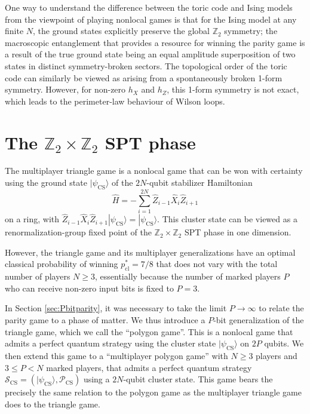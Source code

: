 \documentclass[prb,twocolumn,showpacs,amssymb,superscriptaddress]{revtex4-2}
\begin{document}
One way to understand the difference between the toric code and Ising models from the viewpoint of playing nonlocal games is that for the Ising model at any finite $N$, the ground states explicitly preserve the global $\mathbb{Z}_2$ symmetry; the macroscopic entanglement that provides a resource for winning the parity game is a result of the true ground state being an equal amplitude superposition of two states in distinct symmetry-broken sectors. The topological order of the toric code can similarly be viewed as arising from a spontaneously broken 1-form symmetry\cite{GKSW}.  However, for non-zero $h_X$ and $h_Z$, this 1-form symmetry is not exact, which leads to the perimeter-law behaviour of Wilson loops. 

\section{The $\mathbb{Z}_2 \times \mathbb{Z}_2$ SPT phase}
The multiplayer triangle game\cite{Cluster,Bravyi,DanielMiyake} is a nonlocal game that can be won with certainty using the ground state $|\psi_{\mathrm{CS}}\rangle$ of the $2N$-qubit stabilizer Hamiltonian
\begin{equation}
\hat{H} = -\sum_{i=1}^{2N} \hat{Z}_{i-1} \hat{X}_{i} \hat{Z}_{i+1}
\end{equation}
on a ring, with $\hat{Z}_{i-1}\hat{X}_{i}\hat{Z}_{i+1}|\psi_{\mathrm{CS}}\rangle = |\psi_{\mathrm{CS}}\rangle$. This cluster state can be viewed as a renormalization-group fixed point of the $\mathbb{Z}_2 \times \mathbb{Z}_2$ SPT phase in one dimension\cite{Verstraete,DanielMiyake}.

However, the triangle game and its multiplayer generalizations\cite{Bravyi,DanielMiyake} have an optimal classical probability of winning $p_{\mathrm{cl}}^* = 7/8$ that does not vary with the total number of players $N \geq 3$, essentially because the number of marked players $P$ who can receive non-zero input bits is fixed to $P=3$.

In Section \ref{sec:Pbitparity}, it was necessary to take the limit $P \to \infty$ to relate the parity game to a phase of matter. We thus introduce a $P$-bit generalization of the triangle game, which we call the ``polygon game''. This is a nonlocal game that admits a perfect quantum strategy using the cluster state $|\psi_{\mathrm{CS}}\rangle$ on $2P$ qubits. We then extend this game to a ``multiplayer polygon game'' with $N \geq 3$ players and $3 \leq P < N$ marked players, that admits a perfect quantum strategy $\mathcal{S}_{\mathrm{CS}} = (|\psi_{\mathrm{CS}}\rangle,\mathcal{P}_{\mathrm{CS}})$ using a $2N$-qubit cluster state. This game bears the precisely the same relation to the polygon game as the multiplayer triangle game does to the triangle game.
\end{document}
